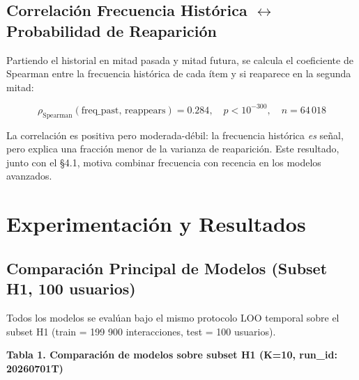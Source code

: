 \documentclass{article}
\begin{document}
\subsection{Correlación Frecuencia Histórica $\leftrightarrow$ Probabilidad de Reaparición}\label{correlaciuxf3n-frecuencia-histuxf3rica-probabilidad-de-reapariciuxf3n}

Partiendo el historial en mitad pasada y mitad futura, se calcula el coeficiente de Spearman entre la frecuencia histórica de cada ítem y si reaparece en la segunda mitad:

\[
\rho_{\text{Spearman}}(\text{freq\_past},\, \text{reappears}) = 0.284, \quad p < 10^{-300}, \quad n = 64\,018
\]

La correlación es positiva pero moderada-débil: la frecuencia histórica \emph{es} señal, pero explica una fracción menor de la varianza de reaparición. Este resultado, junto con el §4.1, motiva combinar frecuencia con recencia en los modelos avanzados.

\section{Experimentación y Resultados}\label{experimentaciuxf3n-y-resultados}

\subsection{Comparación Principal de Modelos (Subset H1, 100 usuarios)}\label{comparaciuxf3n-principal-de-modelos-subset-h1-100-usuarios}

Todos los modelos se evalúan bajo el mismo protocolo LOO temporal sobre el subset H1 (train = 199 900 interacciones, test = 100 usuarios).

\textbf{Tabla 1. Comparación de modelos sobre subset H1 (K=10, run\_id: 20260701T)}
\end{document}

